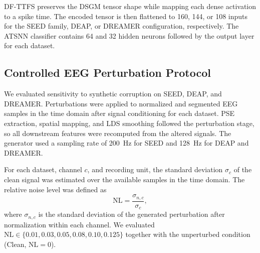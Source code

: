 \documentclass[12pt]{article}
\begin{document}
DF-TTFS preserves the DSGM tensor shape while mapping each dense activation to a spike time. The encoded tensor is then flattened to 160, 144, or 108 inputs for the SEED family, DEAP, or DREAMER configuration, respectively. The ATSNN classifier contains 64 and 32 hidden neurons followed by the output layer for each dataset.

\subsection{Controlled EEG Perturbation Protocol}\label{supp:controlled_perturbations}

We evaluated sensitivity to synthetic corruption on SEED, DEAP, and DREAMER. Perturbations were applied to normalized and segmented EEG samples in the time domain after signal conditioning for each dataset. PSE extraction, spatial mapping, and LDS smoothing followed the perturbation stage, so all downstream features were recomputed from the altered signals. The generator used a sampling rate of 200~Hz for SEED and 128~Hz for DEAP and DREAMER.

For each dataset, channel $c$, and recording unit, the standard deviation $\sigma_c$ of the clean signal was estimated over the available samples in the time domain. The relative noise level was defined as
\begin{equation}
\mathrm{NL}=\frac{\sigma_{n,c}}{\sigma_c},
\label{eq:relative_noise_level}
\end{equation}
where $\sigma_{n,c}$ is the standard deviation of the generated perturbation after normalization within each channel. We evaluated $\mathrm{NL}\in\{0.01,0.03,0.05,0.08,0.10,0.125\}$ together with the unperturbed condition (Clean, $\mathrm{NL}=0$).
\end{document}
